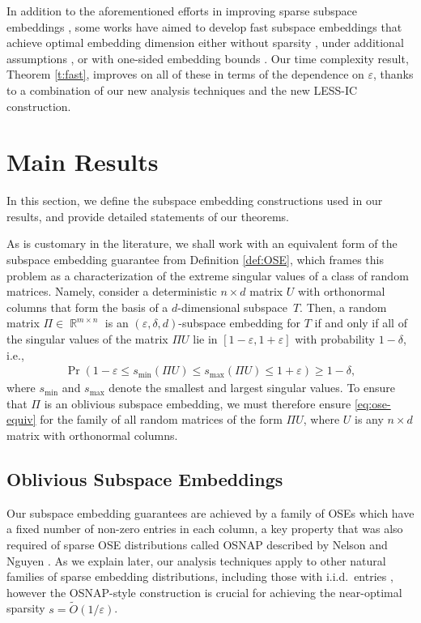 \documentclass[11pt]{amsart}
\numberwithin{equation}{section}
\numberwithin{equation}{section}
\DeclareMathOperator{\R}{\mathbb{R}}
\theoremstyle{remark}
\theoremstyle{definition}
\begin{document}
In addition to the aforementioned efforts in improving sparse subspace embeddings \cite{clarkson2013low,meng2013low,nelson2013osnap,bourgain2015toward,cohen2016nearly,chenakkod2024optimal}, some works have aimed to develop fast subspace embeddings that achieve optimal embedding dimension either without sparsity \cite{chepurko2022near,cherapanamjeri2023optimal}, under additional assumptions \cite{cartis2021hashing}, or with one-sided embedding bounds \cite{tropp2025comparison}. Our time complexity result, Theorem \ref{t:fast}, improves on all of these in terms of the dependence on $\varepsilon$, thanks to a combination of our new analysis techniques and the new LESS-IC construction.


\section{Main Results}


In this section, we define the subspace embedding constructions used in our results, and provide detailed statements of our theorems.


As is customary in the literature, we shall work with an equivalent form of the subspace embedding guarantee from Definition \ref{def:OSE}, which frames this problem as a characterization of the extreme singular values of a class of random matrices. Namely, consider a deterministic $n\times d$ matrix $U$ with orthonormal columns that form the basis of a $d$-dimensional subspace~$T$. Then, a random matrix $\Pi\in\R^{m\times n}$ is an $(\varepsilon,\delta,d)$-subspace embedding for $T$ if and only if all of the singular values of the matrix $\Pi U$ lie in $[1-\varepsilon,1+\varepsilon]$ with probability $1-\delta$, i.e., 
\begin{align}
\Pr(1-\varepsilon\leq s_{\min}(\Pi U)\leq s_{\max}(\Pi U)\leq 1+\varepsilon)\geq 1-\delta,\label{eq:ose-equiv}
\end{align}
where $s_{\min}$ and $s_{\max}$ denote the smallest and largest singular values. To ensure that $\Pi$ is an oblivious subspace embedding, we must therefore ensure \eqref{eq:ose-equiv} for the family of all random matrices of the form $\Pi U$, where $U$ is any $n\times d$ matrix with orthonormal columns.

\subsection{Oblivious Subspace Embeddings}

Our subspace embedding guarantees are achieved by a family of OSEs which have a fixed number of non-zero entries in each column, a key property that was also required of sparse OSE distributions called OSNAP described by Nelson and Nguyen \cite{nelson2013osnap}. As we explain later, our analysis techniques apply to other natural families of sparse embedding distributions, including those with i.i.d.~entries \cite{achlioptas2003database}, however the OSNAP-style construction is crucial for achieving the near-optimal sparsity $s=\tilde O(1/\varepsilon)$.
\end{document}
